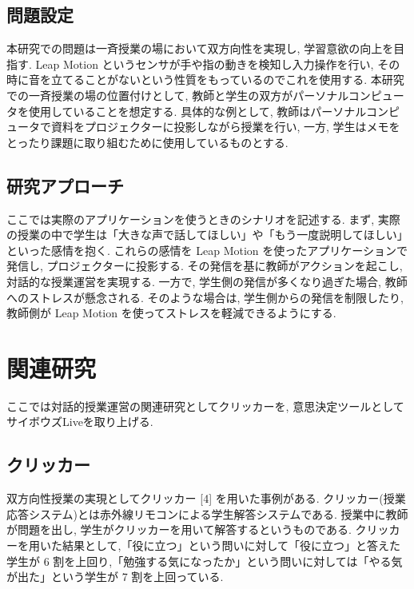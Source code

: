 \documentclass{funthesis}
\begin{document}
\section{問題設定}
本研究での問題は一斉授業の場において双方向性を実現し, 学習意欲の向上を目指す. Leap Motion というセンサが手や指の動きを検知し入力操作を行い, その時に音を立てることがないという性質をもっているのでこれを使用する. 本研究での一斉授業の場の位置付けとして, 教師と学生の双方がパーソナルコンピュータを使用していることを想定する. 具体的な例として, 教師はパーソナルコンピュータで資料をプロジェクターに投影しながら授業を行い, 一方, 学生はメモをとったり課題に取り組むために使用しているものとする.


\section{研究アプローチ}

ここでは実際のアプリケーションを使うときのシナリオを記述する. まず, 実際の授業の中で学生は「大きな声で話してほしい」や「もう一度説明してほしい」といった感情を抱く. これらの感情を Leap Motion を使ったアプリケーションで発信し, プロジェクターに投影する. その発信を基に教師がアクションを起こし, 対話的な授業運営を実現する. 一方で, 学生側の発信が多くなり過ぎた場合, 教師へのストレスが懸念される. そのような場合は, 学生側からの発信を制限したり, 教師側が Leap Motion を使ってストレスを軽減できるようにする.

\chapter{関連研究}
ここでは対話的授業運営の関連研究としてクリッカーを, 意思決定ツールとしてサイボウズLiveを取り上げる.

\section{クリッカー}
双方向性授業の実現としてクリッカー [4] を用いた事例がある. クリッカー(授業応答システム)とは赤外線リモコンによる学生解答システムである. 授業中に教師が問題を出し, 学生がクリッカーを用いて解答するというものである. クリッカーを用いた結果として,「役に立つ」という問いに対して「役に立つ」と答えた学生が 6 割を上回り,「勉強する気になったか」という問いに対しては「やる気が出た」という学生が 7 割を上回っている.
\end{document}
